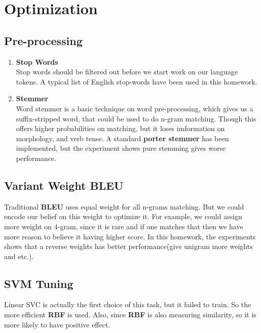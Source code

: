 \documentclass[11pt]{article}
\begin{document}
\section{Optimization} %
\subsection{Pre-processing} %
\label{sub:stemmer_and_wordnet}
\begin{enumerate}
	\item \textbf{Stop Words}\\
	Stop words should be filtered out before we start work on our language tokens. A typical list of English stop-words have been used in this homework.
	\item \textbf{Stemmer}\\
	Word stemmer is a basic technique on word pre-processing, which gives us a suffix-stripped word, that could be used to do n-gram matching. Though this offers higher probabilities on matching, but it loses imformation on morphology, and verb tense. A standard \textbf{porter stemmer}\cite{porter} has been implemented, but the experiment shows pure stemming gives worse performance.
\end{enumerate}

\subsection{Variant Weight \textbf{BLEU}} %
\label{sub:variant_weight_bleu}
Traditional \textbf{BLEU} uses equal weight for all n-grams matching. But we could encode our belief on this weight to optimize it. For example, we could assign more weight on 4-gram, since it is rare and if one matches that then we have more reason to believe it having higher score. In this homework, the experiments shows that a reverse weights has better performance(give unigram more weights and etc.).

\subsection{SVM Tuning} %
\label{sub:svm_tuning}
Linear SVC is actually the first choice of this task, but it failed to train. So the more efficient \textbf{RBF} is used. Also, since \textbf{RBF} is also measuring similarity, so it is more likely to have positive effect.\\
\end{document}
